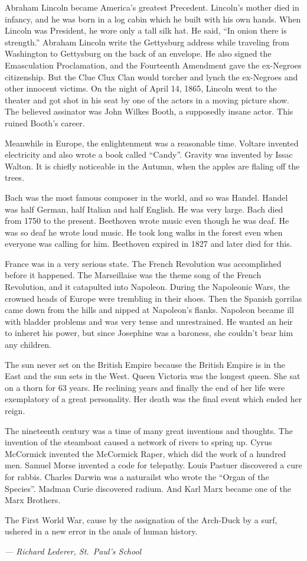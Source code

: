 Abraham Lincoln became America's greatest Precedent. Lincoln's mother
died in infancy, and he was born in a log cabin which he built with
his own hands. When Lincoln was President, he wore only a tall silk
hat. He said, ``In onion there is strength.'' Abraham Lincoln write
the Gettysburg address while traveling from Washington to Gettysburg
on the back of an envelope. He also signed the Emasculation
Proclamation, and the Fourteenth Amendment gave the ex-Negroes
citizenship. But the Clue Clux Clan would torcher and lynch the
ex-Negroes and other innocent victims. On the night of April 14, 1865,
Lincoln went to the theater and got shot in his seat by one of the
actors in a moving picture show. The believed assinator was John
Wilkes Booth, a supposedly insane actor. This ruined Booth's career.

Meanwhile in Europe, the enlightenment was a reasonable time. Voltare
invented electricity and also wrote a book called ``Candy''. Gravity was
invented by Issac Walton. It is chiefly noticeable in the Autumn, when
the apples are flaling off the trees.

Bach was the most famous composer in the world, and so was
Handel. Handel was half German, half Italian and half English. He was
very large. Bach died from 1750 to the present. Beethoven wrote music
even though he was deaf. He was so deaf he wrote loud music. He took
long walks in the forest even when everyone was calling for
him. Beethoven expired in 1827 and later died for this.

France was in a very serious state. The French Revolution was
accomplished before it happened. The Marseillaise was the theme song
of the French Revolution, and it catapulted into Napoleon. During
the Napoleonic Wars, the crowned heads of Europe were trembling in
their shoes. Then the Spanish gorrilas came down from the hills and
nipped at Napoleon's flanks. Napoleon became ill with bladder problems
and was very tense and unrestrained. He wanted an heir to inheret his
power, but since Josephine was a baroness, she couldn't bear him any
children.

The sun never set on the British Empire because the British Empire is
in the East and the sun sets in the West. Queen Victoria was the
longest queen. She sat on a thorn for 63 years. He reclining years and
finally the end of her life were exemplatory of a great
personality. Her death was the final event which ended her reign.

The nineteenth century was a time of many great inventions and
thoughts. The invention of the steamboat caused a network of rivers to
spring up. Cyrus McCormick invented the McCormick Raper, which did the
work of a hundred men. Samuel Morse invented a code for
telepathy. Louis Pastuer discovered a cure for rabbis. Charles Darwin
was a naturailst who wrote the ``Organ of the Species''. Madman Curie
discovered radium. And Karl Marx became one of the Marx Brothers.

The First World War, cause by the assignation of the Arch-Duck by a
surf, ushered in a new error in the anals of human history.

\begin{flushright}
\textit{--- Richard Lederer, St.~Paul's School}
\end{flushright}
